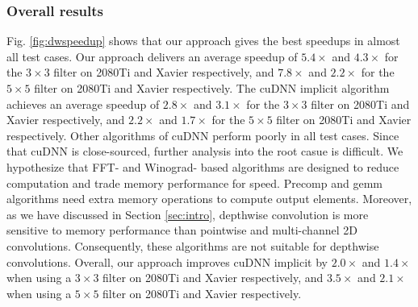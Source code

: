 
\subsubsection{Overall results}
 Fig. \ref{fig:dwspeedup} shows that our approach gives the best speedups in almost all test cases.
Our approach delivers an average speedup of $5.4\times$ and $4.3\times$ for the $3 \times 3$ filter on 2080Ti and Xavier respectively, and $7.8\times$ and $2.2\times$ for the $5 \times 5$ filter on 2080Ti and Xavier respectively.
The cuDNN implicit algorithm achieves an average speedup of $2.8\times$ and $3.1\times$ for the $3 \times 3$ filter on 2080Ti and Xavier respectively, and $2.2\times$ and $1.7\times$ for the $5 \times 5$ filter on 2080Ti and Xavier respectively.
Other algorithms of cuDNN perform poorly in all test cases.
Since that cuDNN is close-sourced, further analysis into the root casue is difficult. We hypothesize that
FFT- and Winograd- based algorithms are designed to reduce computation and trade memory performance for speed. Precomp and gemm algorithms
need extra memory operations to compute output elements. Moreover, as we have discussed in Section \ref{sec:intro}, depthwise convolution
is more sensitive to memory performance than pointwise and multi-channel 2D convolutions. Consequently, these algorithms are not suitable
for depthwise convolutions. Overall, our approach improves cuDNN implicit by $2.0\times$ and $1.4\times$ when using a $3 \times 3$  filter
on 2080Ti and Xavier respectively, and $3.5\times$ and $2.1\times$ when using a $5 \times 5$ filter on 2080Ti and Xavier respectively.

